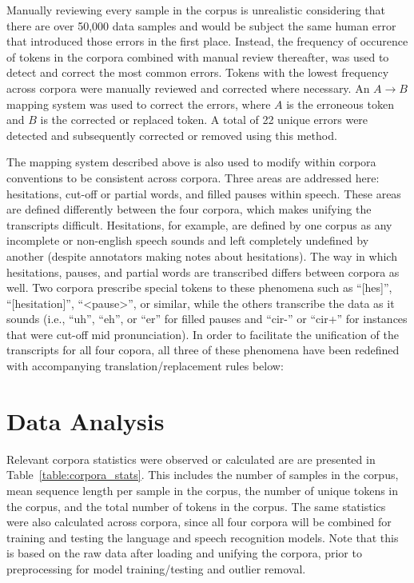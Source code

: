 \documentclass[12pt]{article}
\begin{document}
Manually reviewing every sample in the corpus is unrealistic considering that there are over 50,000 data samples and would be subject the same
human error that introduced those errors in the first place. Instead, the frequency of occurence of tokens in the corpora combined with manual review
thereafter, was used to detect and correct the most common errors. Tokens with the lowest frequency across corpora were manually reviewed and
corrected where necessary. An \(A \rightarrow B\) mapping system was used to correct the errors, where \(A\) is the erroneous token and \(B\) is the
corrected or replaced token. A total of 22 unique errors were detected and subsequently corrected or removed using this method.

The mapping system described above is also used to modify within corpora conventions to be consistent across corpora. Three areas are addressed here:
hesitations, cut-off or partial words, and filled pauses within speech. These areas are defined differently between the four corpora, which makes
unifying the transcripts difficult. Hesitations, for example, are defined by one corpus as any incomplete or non-english speech sounds and left
completely undefined by another (despite annotators making notes about hesitations). The way in which hesitations, pauses, and partial words are
transcribed differs between corpora as well. Two corpora prescribe special tokens to these phenomena such as ``[hes]'', ``[hesitation]'', ``<pause>'',
or similar, while the others transcribe the data as it sounds (i.e., ``uh'', ``eh'', or ``er'' for filled pauses and ``cir-'' or ``cir+'' for
instances that were cut-off mid pronunciation). In order to facilitate the unification of the transcripts for all four copora, all three of these
phenomena have been redefined with accompanying translation/replacement rules below:

\section{Data Analysis}\label{sec:data_analysis}
Relevant corpora statistics were observed or calculated are are presented in Table~\ref{table:corpora_stats}. This includes the number of samples in
the corpus, mean sequence length per sample in the corpus, the number of unique tokens in the corpus, and the total number of tokens in the corpus.
The same statistics were also calculated across corpora, since all four corpora will be combined for training and testing the language and speech
recognition models. Note that this is based on the raw data after loading and unifying the corpora, prior to preprocessing for model training/testing
and outlier removal.
\end{document}
